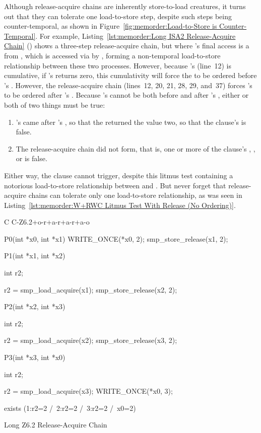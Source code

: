 Although release-acquire chains are inherently store-to-load creatures,
it turns out that they can tolerate one load-to-store step, despite
such steps being counter-temporal, as shown in
Figure~\ref{fig:memorder:Load-to-Store is Counter-Temporal}.
For example,
Listing~\ref{lst:memorder:Long ISA2 Release-Acquire Chain}
()
shows a three-step release-acquire chain, but where 's
final access is a  from , which is
accessed via  by , forming a non-temporal
load-to-store relationship between these two processes.
However, because 's  (line~12)
is cumulative, if 's  returns zero,
this cumulativity will force the  to be ordered
before 's .
However, the release-acquire chain (lines~12, 20, 21, 28, 29, and~37)
forces 's  to be ordered after 's
.
Because 's  cannot be both before and after
's , either or both of two things must
be true:

\begin{enumerate}
\item	{}'s  came after 's
	, so that the  returned
	the value two, so that the  clause's 
	is false.
\item	The release-acquire chain did not form, that is, one or more
	of the  clause's , , or 
	is false.
\end{enumerate}

Either way, the  clause cannot trigger, despite this litmus
test containing a notorious load-to-store relationship between
 and .
But never forget that release-acquire chains can tolerate only one
load-to-store relationship, as was seen in
Listing~\ref{lst:memorder:W+RWC Litmus Test With Release (No Ordering)}.

\begin{listing}[tbp]
{ \scriptsize
\begin{verbbox}[\LstLineNo]
C C-Z6.2+o-r+a-r+a-r+a-o
{
}

P0(int *x0, int *x1)
{
  WRITE_ONCE(*x0, 2);
  smp_store_release(x1, 2);
}


P1(int *x1, int *x2)
{
  int r2;

  r2 = smp_load_acquire(x1);
  smp_store_release(x2, 2);
}

P2(int *x2, int *x3)
{
  int r2;

  r2 = smp_load_acquire(x2);
  smp_store_release(x3, 2);
}

P3(int *x3, int *x0)
{
  int r2;

  r2 = smp_load_acquire(x3);
  WRITE_ONCE(*x0, 3);
}

exists (1:r2=2 /\ 2:r2=2 /\ 3:r2=2 /\ x0=2)
\end{verbbox}
}
\centering
\theverbbox
\caption{Long Z6.2 Release-Acquire Chain}
\label{lst:memorder:Long Z6.2 Release-Acquire Chain}
\end{listing}

